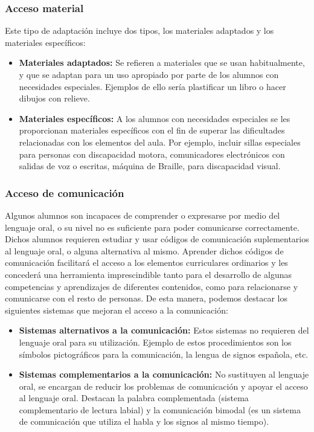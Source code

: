 \subsubsection{Acceso material}
Este tipo de adaptación incluye dos tipos, los materiales adaptados y los materiales específicos:
\begin{itemize}
    \item \textbf{Materiales adaptados:} Se refieren a materiales que se usan habitualmente, y que se adaptan para un uso apropiado por parte de los alumnos con necesidades especiales. Ejemplos de ello sería plastificar un libro o hacer dibujos con relieve.
    \item \textbf{Materiales específicos:} A los alumnos con necesidades especiales se les proporcionan materiales específicos con el fin de superar las dificultades relacionadas con los elementos del aula. Por ejemplo, incluir sillas especiales para personas con discapacidad motora, comunicadores electrónicos con salidas de voz o escritas, máquina de Braille, para discapacidad visual.
\end{itemize}

\subsubsection{Acceso de comunicación}
Algunos alumnos son incapaces de comprender o expresarse por medio del lenguaje oral, o su nivel no es suficiente para poder comunicarse correctamente. Dichos alumnos requieren estudiar y usar códigos de comunicación suplementarios al lenguaje oral, o alguna alternativa al mismo. Aprender dichos códigos de comunicación facilitará el acceso a los elementos curriculares ordinarios y les concederá una herramienta imprescindible tanto para el desarrollo de algunas competencias y aprendizajes de diferentes contenidos, como para relacionarse y comunicarse con el resto de personas. De esta manera, podemos destacar los siguientes sistemas que mejoran el acceso a la comunicación:
\begin{itemize}
    \item \textbf{Sistemas alternativos a la comunicación:} Estos sistemas no requieren del lenguaje oral para su utilización. Ejemplo de estos procedimientos son los símbolos pictográficos para la comunicación, la lengua de signos española, etc.

    \item \textbf{Sistemas complementarios a la comunicación:} No sustituyen al lenguaje oral, se encargan de reducir los problemas de comunicación y apoyar el acceso al lenguaje oral. Destacan la palabra complementada (sistema complementario de lectura labial) y la comunicación bimodal (es un sistema de comunicación que utiliza el habla y los signos al mismo tiempo).
\end{itemize}

